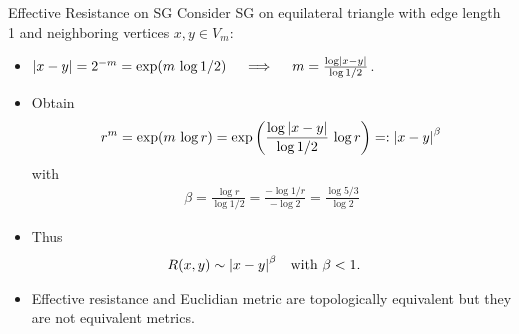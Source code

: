 \begin{frame}[allowframebreaks]{Effective Resistance on SG}
    Consider SG on equilateral triangle with edge length 1 and neighboring vertices $x,y \in V_{m}$:
    \begin{itemize}
        \item $\left\vert x-y \right\vert=2^{-m} = \exp(m\, \log{1/2}) \quad\implies\quad m = \frac{\log\left\vert x-y \right\vert}{\log{1/2}}$.
        \item Obtain
        \begin{align*}
            r^{m} = \exp(m\, \log{r})
            = \exp\left( \frac{\log\left\vert x-y \right\vert}{\log{1/2}} \, \log{r} \right)
            =: \left\vert x-y \right\vert^{\beta}
        \end{align*}
        with
        \begin{align*}
            \beta = \frac{\log{r}}{\log{1/2}}
            = \frac{-\log{1/r}}{-\log{2}}
            = \frac{\log{5/3}}{\log{2}}
        \end{align*}
        \item Thus
        \begin{align*}
            R(x,y) &\sim \left\vert x-y \right\vert^{\beta} && \text{with } \beta < 1.
        \end{align*}
        \item Effective resistance and Euclidian metric are topologically equivalent but they are not equivalent metrics.
    \end{itemize}
\end{frame}


